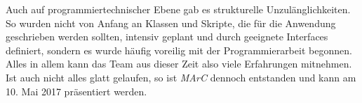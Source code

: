 Auch auf programmiertechnischer Ebene gab es strukturelle Unzulänglichkeiten. So wurden nicht von Anfang an Klassen und Skripte, die für die Anwendung geschrieben werden sollten, intensiv geplant und durch geeignete Interfaces definiert, sondern es wurde häufig voreilig mit der Programmierarbeit begonnen.\\
Alles in allem kann das Team aus dieser Zeit also viele Erfahrungen mitnehmen. Ist auch nicht alles glatt gelaufen, so ist \textit{MArC} dennoch entstanden und kann am 10. Mai 2017 präsentiert werden.



























